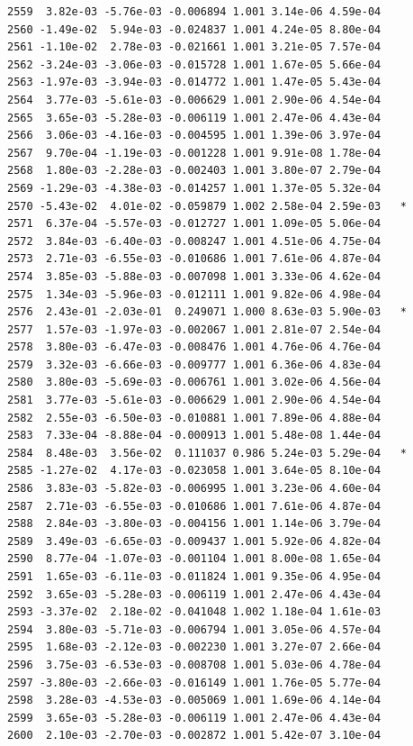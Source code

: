\documentclass[
  letterpaper,
  DIV=11,
  numbers=noendperiod]{scrartcl}
\begin{document}
\begin{verbatim}
2559  3.82e-03 -5.76e-03 -0.006894 1.001 3.14e-06 4.59e-04    
2560 -1.49e-02  5.94e-03 -0.024837 1.001 4.24e-05 8.80e-04    
2561 -1.10e-02  2.78e-03 -0.021661 1.001 3.21e-05 7.57e-04    
2562 -3.24e-03 -3.06e-03 -0.015728 1.001 1.67e-05 5.66e-04    
2563 -1.97e-03 -3.94e-03 -0.014772 1.001 1.47e-05 5.43e-04    
2564  3.77e-03 -5.61e-03 -0.006629 1.001 2.90e-06 4.54e-04    
2565  3.65e-03 -5.28e-03 -0.006119 1.001 2.47e-06 4.43e-04    
2566  3.06e-03 -4.16e-03 -0.004595 1.001 1.39e-06 3.97e-04    
2567  9.70e-04 -1.19e-03 -0.001228 1.001 9.91e-08 1.78e-04    
2568  1.80e-03 -2.28e-03 -0.002403 1.001 3.80e-07 2.79e-04    
2569 -1.29e-03 -4.38e-03 -0.014257 1.001 1.37e-05 5.32e-04    
2570 -5.43e-02  4.01e-02 -0.059879 1.002 2.58e-04 2.59e-03   *
2571  6.37e-04 -5.57e-03 -0.012727 1.001 1.09e-05 5.06e-04    
2572  3.84e-03 -6.40e-03 -0.008247 1.001 4.51e-06 4.75e-04    
2573  2.71e-03 -6.55e-03 -0.010686 1.001 7.61e-06 4.87e-04    
2574  3.85e-03 -5.88e-03 -0.007098 1.001 3.33e-06 4.62e-04    
2575  1.34e-03 -5.96e-03 -0.012111 1.001 9.82e-06 4.98e-04    
2576  2.43e-01 -2.03e-01  0.249071 1.000 8.63e-03 5.90e-03   *
2577  1.57e-03 -1.97e-03 -0.002067 1.001 2.81e-07 2.54e-04    
2578  3.80e-03 -6.47e-03 -0.008476 1.001 4.76e-06 4.76e-04    
2579  3.32e-03 -6.66e-03 -0.009777 1.001 6.36e-06 4.83e-04    
2580  3.80e-03 -5.69e-03 -0.006761 1.001 3.02e-06 4.56e-04    
2581  3.77e-03 -5.61e-03 -0.006629 1.001 2.90e-06 4.54e-04    
2582  2.55e-03 -6.50e-03 -0.010881 1.001 7.89e-06 4.88e-04    
2583  7.33e-04 -8.88e-04 -0.000913 1.001 5.48e-08 1.44e-04    
2584  8.48e-03  3.56e-02  0.111037 0.986 5.24e-03 5.29e-04   *
2585 -1.27e-02  4.17e-03 -0.023058 1.001 3.64e-05 8.10e-04    
2586  3.83e-03 -5.82e-03 -0.006995 1.001 3.23e-06 4.60e-04    
2587  2.71e-03 -6.55e-03 -0.010686 1.001 7.61e-06 4.87e-04    
2588  2.84e-03 -3.80e-03 -0.004156 1.001 1.14e-06 3.79e-04    
2589  3.49e-03 -6.65e-03 -0.009437 1.001 5.92e-06 4.82e-04    
2590  8.77e-04 -1.07e-03 -0.001104 1.001 8.00e-08 1.65e-04    
2591  1.65e-03 -6.11e-03 -0.011824 1.001 9.35e-06 4.95e-04    
2592  3.65e-03 -5.28e-03 -0.006119 1.001 2.47e-06 4.43e-04    
2593 -3.37e-02  2.18e-02 -0.041048 1.002 1.18e-04 1.61e-03    
2594  3.80e-03 -5.71e-03 -0.006794 1.001 3.05e-06 4.57e-04    
2595  1.68e-03 -2.12e-03 -0.002230 1.001 3.27e-07 2.66e-04    
2596  3.75e-03 -6.53e-03 -0.008708 1.001 5.03e-06 4.78e-04    
2597 -3.80e-03 -2.66e-03 -0.016149 1.001 1.76e-05 5.77e-04    
2598  3.28e-03 -4.53e-03 -0.005069 1.001 1.69e-06 4.14e-04    
2599  3.65e-03 -5.28e-03 -0.006119 1.001 2.47e-06 4.43e-04    
2600  2.10e-03 -2.70e-03 -0.002872 1.001 5.42e-07 3.10e-04    

\end{verbatim}
\end{document}
